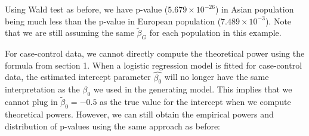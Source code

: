 \documentclass[
]{article}
\begin{document}
Using Wald test as before, we have p-value (\(5.679 \times 10 ^{-26}\))
in Asian population being much less than the p-value in European
population (\(7.489 \times 10^{-3}\)). Note that we are still assuming
the same \(\tilde{\beta}_G\) for each population in this example.

For case-control data, we cannot directly compute the theoretical power
using the formula from section 1. When a logistic regression model is
fitted for case-control data, the estimated intercept parameter
\(\hat{\beta_0}\) will no longer have the same interpretation as the
\(\beta_0\) we used in the generating model. This implies that we cannot
plug in \(\tilde{\beta}_0=-0.5\) as the true value for the intercept
when we compute theoretical powers. However, we can still obtain the
empirical powers and distribution of p-values using the same approach as
before:
\end{document}
